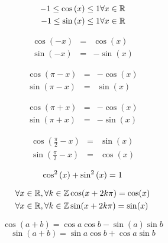 
\begin{multicols}{2}

\begin{eqnarray}
-1 \leq \cos{(x)} \leq 1 & \forall x \in \mathbb{R} \\  
-1 \leq \sin{(x)} \leq 1 & \forall x \in \mathbb{R} 
\end{eqnarray}


\begin{eqnarray}
\cos(-x) & = & \cos{(x)}\\
\sin(-x) & = & -\sin{(x)}
\end{eqnarray}

\begin{eqnarray}
\cos(\pi - x) & = & -\cos(x)\\
\sin(\pi - x) & = &\sin(x)
\end{eqnarray}

\begin{eqnarray}
\cos(\pi + x) & = & -\cos(x)\\
\sin(\pi + x) & = & -\sin(x)
\end{eqnarray}

\begin{eqnarray}
\cos(\frac{\pi}{2} - x) & = & \sin(x)\\
\sin(\frac{\pi}{2} - x) & = &\cos(x)
\end{eqnarray}

\begin{equation}
\cos^2{(x)}+\sin^2{(x)} = 1\\
\end{equation}

\end{multicols}


\begin{eqnarray}{ }
\forall x \in \mathbb{R}, \forall k \in \mathbb{Z} & \cos (x + 2k \pi)  =  \cos(x) \\ 
\forall x \in \mathbb{R}, \forall k \in \mathbb{Z} & \sin (x + 2k \pi)  =  \sin(x)  
\end{eqnarray}

\begin{multicols}{2}

\begin{equation}
\cos(a+b) = \cos{a}\cos{b} - \sin(a)\sin{b}
\label{cosaplusb}
\end{equation}
%
%
\begin{equation}
\sin(a+b) = \sin{a}\cos{b} + \cos{a}\sin{b}
\label{sinaplusb}
\end{equation}

\end{multicols}




